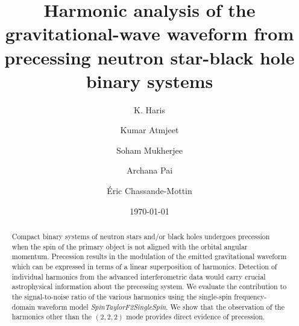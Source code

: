 \documentclass[preprint,onecolumn,,tightenlines,superscriptaddress,showpacs,nofootinbib,eqsecnum,amsfonts,amsmath]{revtex4}
\def\red#1{\textcolor{red}{#1}}
\def\ECM#1{\textcolor{green}{ECM: #1}}
\def\ADAM#1{\textcolor{blue}{ADAM:#1}}
\begin{document}
\title{Harmonic analysis of the gravitational-wave waveform from precessing neutron star-black hole binary systems}
\author{K. Haris}
\author{Kumar Atmjeet}

\author{Soham Mukherjee}
\author{Archana Pai}
\author{\'Eric Chassande-Mottin}
\begin{abstract} 
  Compact binary systems of neutron stars and/or black holes undergoes
  precession when the spin of the primary object is not aligned with the orbital
  angular momentum. Precession results in the modulation of the emitted
  gravitational waveform which can be expressed in terms of a linear
  superposition of harmonics. Detection of individual harmonics from the
  advanced interferometric data would carry crucial astrophysical information
  about the precessing system. We evaluate the contribution to the
  signal-to-noise ratio of the various harmonics using the single-spin
  frequency-domain waveform model {\it SpinTaylorF2SingleSpin}. We show that the
  observation of the harmonics other than the $(2,2,2)$ mode provides
  direct evidence of precession.
\end{abstract}
\date{\today}  \maketitle
\end{document}

